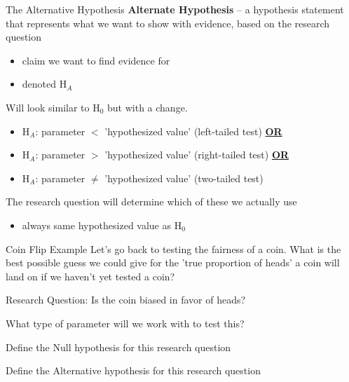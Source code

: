 \documentclass{beamer}
\begin{document}
\begin{frame}{The Alternative Hypothesis}
\textbf{Alternate Hypothesis} -- a hypothesis statement that represents what we want to show with evidence, based on the research question
\begin{itemize}
    \item claim we want to find evidence for
    \item denoted H$_A$
\end{itemize} \vspace{8mm}

Will look similar to H$_0$ but with a change.
\begin{itemize}
    \item H$_A$: parameter $<$ 'hypothesized value' (left-tailed test) \textbf{\underline{OR}}
    \item H$_A$: parameter $>$ 'hypothesized value' (right-tailed test) \textbf{\underline{OR}}
    \item H$_A$: parameter $\neq$ 'hypothesized value' (two-tailed test)
\end{itemize} \vspace{6mm}

The research question will determine which of these we actually use
\begin{itemize}
    \item always same hypothesized value as H$_0$
\end{itemize}

\end{frame}

\begin{frame}{Coin Flip Example}
Let's go back to testing the fairness of a coin. What is the best possible guess we could give for the 'true proportion of heads' a coin will land on if we haven't yet tested a coin? 
\vspace{4mm}

Research Question: Is the coin biased in favor of heads?

\hrulefill
\vspace{2mm}

What type of parameter will we work with to test this? \vspace{12mm}

Define the Null hypothesis for this research question \vspace{12mm}

Define the Alternative hypothesis for this research question \vspace{12mm}
\end{frame}
\end{document}
